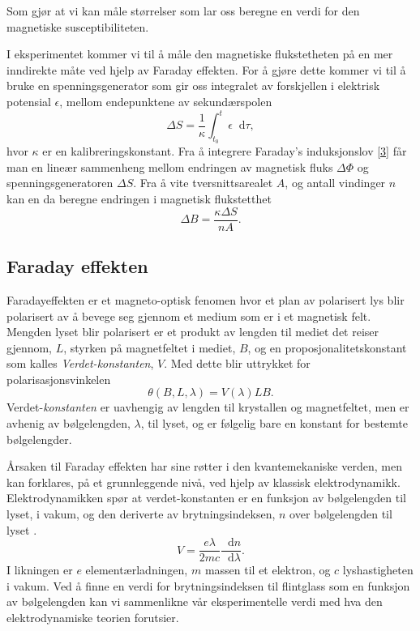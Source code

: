 \documentclass[%
 reprint,
 amsmath,amssymb,
 aps,
]{revtex4-1}
\newcommand*\diff{\mathop{}\!\mathrm{d}}
\begin{document}
Som gjør at vi kan måle størrelser som lar oss beregne en verdi for den magnetiske susceptibiliteten.
\par
I eksperimentet kommer vi til å måle den magnetiske flukstetheten på en mer inndirekte måte ved hjelp av Faraday effekten. For å gjøre dette kommer vi til å bruke en spenningsgenerator som gir oss integralet av forskjellen i elektrisk potensial $\epsilon$, mellom endepunktene av sekundærspolen
\begin{equation}
  \Delta S = \frac{1}{\kappa}\int_{t_0}^{t}\epsilon \diff \tau, \label{deltas}
\end{equation}
hvor $\kappa$ er en kalibreringskonstant. Fra å integrere Faraday's induksjonslov \eqref{3} får man en lineær sammenheng mellom endringen av magnetisk fluks $\Delta \Phi$ og spenningsgeneratoren $\Delta S$. Fra å vite tversnittsarealet $A$, og antall vindinger $n$ kan en da beregne endringen i magnetisk flukstetthet
\begin{equation}
  \Delta B = \frac{\kappa\Delta S}{nA}.\label{deltab}
\end{equation}
\subsection{Faraday effekten}
Faradayeffekten er et magneto-optisk fenomen hvor et plan av polarisert lys blir polarisert av å bevege seg gjennom et medium som er i et magnetisk felt. Mengden lyset blir polarisert er et produkt av lengden til mediet det reiser gjennom, $L$, styrken på magnetfeltet i mediet, $B$, og en proposjonalitetskonstant som kalles \textit{Verdet-konstanten}, $V$. Med dette blir uttrykket for polarisasjonsvinkelen
\begin{equation}
  \theta\left(B, L, \lambda\right) = V\left(\lambda\right)LB.\label{verdet}
\end{equation}
Verdet-\textit{konstanten} er uavhengig av lengden til krystallen og magnetfeltet, men er avhenig av bølgelengden, $\lambda$, til lyset, og er følgelig bare en konstant for bestemte bølgelengder. \par
Årsaken til Faraday effekten har sine røtter i den kvantemekaniske verden, men kan forklares, på et grunnleggende nivå, ved hjelp av klassisk elektrodynamikk. Elektrodynamikken spør at verdet-konstanten er en funksjon av bølgelengden til lyset, i vakum, og den deriverte av brytningsindeksen, $n$ over bølgelengden til lyset \cite{pedrotti_faraday_1990}.
\begin{equation}
  V = \frac{e\lambda}{2mc} \frac{\diff n}{\diff\lambda}.
\end{equation}
I likningen er $e$ elementærladningen, $m$ massen til et elektron, og $c$ lyshastigheten i vakum. Ved å finne en verdi for brytningsindeksen til flintglass som en funksjon av bølgelengden kan vi sammenlikne vår eksperimentelle verdi med hva den elektrodynamiske teorien forutsier.
\end{document}
